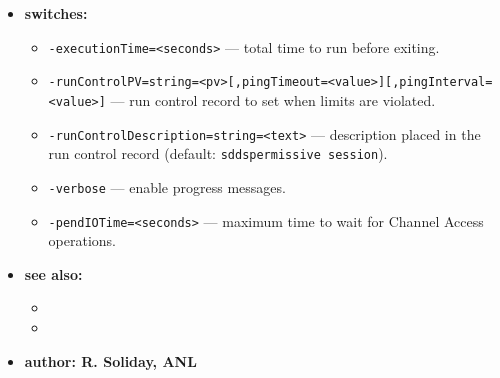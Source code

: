 \begin{itemize}
\item {\bf switches:}
\begin{itemize}
\item {\tt -executionTime=<seconds>} --- total time to run before exiting.
\item {\tt -runControlPV=string=<pv>[,pingTimeout=<value>][,pingInterval=<value>]} --- run
  control record to set when limits are violated.
\item {\tt -runControlDescription=string=<text>} --- description placed in the run
  control record (default: \verb+sddspermissive session+).
\item {\tt -verbose} --- enable progress messages.
\item {\tt -pendIOTime=<seconds>} --- maximum time to wait for Channel Access operations.
\end{itemize}

\item {\bf see also:}
\begin{itemize}
\item {}
\item {}
\end{itemize}

\item {\bf author: R. Soliday, ANL}
\end{itemize}
